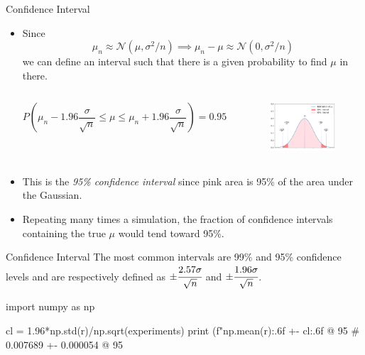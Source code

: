 \documentclass{beamer}
\begin{document}
\begin{frame}{Confidence Interval}
\begin{itemize}
\item Since
\begin{equation*}
\mu_n \approx \mathcal{N}(\mu, \sigma^2/n)\implies \mu_n - \mu \approx \mathcal{N}(0, \sigma^2/n)
\end{equation*}
we can define an interval such that there is a given probability to find $\mu$ in there.
\begin{columns}
\begin{equation*}
P\left(\mu_n - 1.96\frac{\sigma}{\sqrt{n}}\le \mu \le \mu_n + 1.96\frac{\sigma}{\sqrt{n}}\right) = 0.95
\end{equation*}
\begin{figure}[h]
    \begin{center}
    \includegraphics[width=0.8\linewidth]{confidence_interval_pink}
    \end{center}
\end{figure}    
\end{columns}
\item This is the \emph{95\% confidence interval} since pink area is 95\% of the area under the Gaussian.
\item Repeating many times a simulation, the fraction of confidence intervals containing the true $\mu$ would tend toward 95\%.
\end{itemize}
\end{frame}

\begin{frame}[fragile]{Confidence Interval}
The most common intervals are 99\% and 95\% confidence levels and are respectively defined as $\pm \cfrac{2.57\sigma}{\sqrt{n}}$ and $\pm \cfrac{1.96\sigma}{\sqrt{n}}$. 
\begin{ipython}
import numpy as np

cl = 1.96*np.std(r)/np.sqrt(experiments)
print (f"{np.mean(r):.6f} +- {cl:.6f} @ 95%
# 0.007689 +- 0.000054 @ 95%
\end{ipython}
\end{frame}
\end{document}
